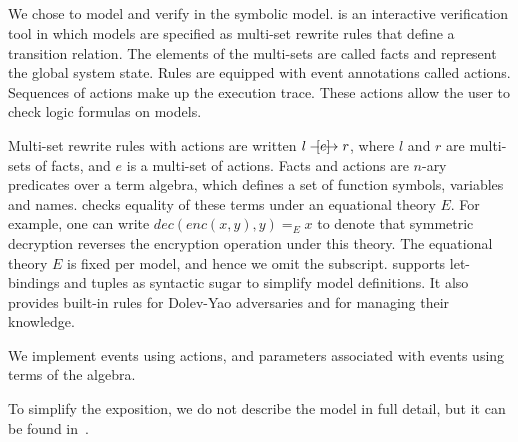\subsection{\mTamarin{}}
\label{sec:tamarin}
We chose \mTamarin{} to model and verify \mEdhoc{} in the symbolic model.
%
\mTamarin{} is an interactive verification tool in which models are specified
as multi-set rewrite rules that define a transition relation.
%
The elements of the multi-sets are called facts and represent the global system
state.
%
Rules are equipped with event annotations called actions. Sequences of actions make up the execution trace.
%
These actions allow the user to check logic formulas on models.
%
%

Multi-set rewrite rules with actions are written $ l \ifarrow[e] r $,
where $l$ and $r$ are multi-sets of facts, and $e$ is a multi-set of actions.
%
Facts and actions are $n$-ary predicates over a term algebra, which defines a
set of function symbols, variables and names.
%
\mTamarin{} checks equality of these terms under an equational theory $E$.
%
For example, one can write $ dec(enc(x,y),y) =_E x $
to denote that symmetric decryption reverses the encryption operation under
this theory.
%
The equational theory $E$ is fixed per model, and hence we omit the subscript.
%
\mTamarin{} supports let-bindings and tuples as syntactic sugar to simplify
model definitions.
%
It also provides built-in rules for Dolev-Yao adversaries and for
managing their knowledge.
%

We implement events using actions, and parameters associated with events using
terms of the algebra.
%

To simplify the exposition, we do not describe the model in full detail, but
it can be found in~\cite{edhocTamarinRepo}.\\
%

